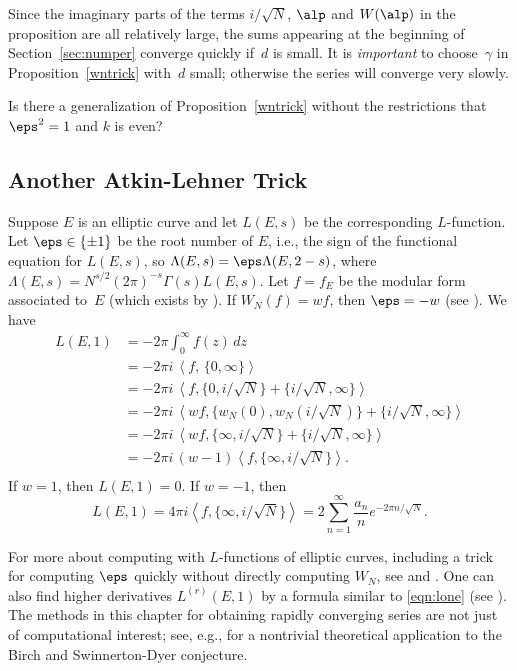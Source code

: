 Since the imaginary parts of the terms $i/\sqrt{N}$, $\alp$ and
$W(\alp)$ in the proposition are all relatively large, the sums
appearing at the beginning of Section~\ref{sec:numper} converge
quickly if~$d$ is small.  It is {\em important} to
choose~$\gamma$ in Proposition~\ref{wntrick} with~$d$ small; otherwise
the series will converge very slowly.

\begin{remark}
  Is there a generalization of Proposition~\ref{wntrick}
  without the restrictions that $\eps^2=1$ and $k$ is even?
\end{remark}

\subsection{Another Atkin-Lehner Trick}
  Suppose $E$ is an elliptic curve and let $L(E,s)$ be the
  corresponding $L$-function.  Let $\eps\in\{\pm 1\}$ be the root
  number of $E$, i.e., the sign of the functional equation for
  $L(E,s)$, so $\Lambda(E,s) = \eps\Lambda(E,2-s)$, where
  $\Lambda(E,s) = N^{s/2} (2\pi)^{-s} \Gamma(s) L(E,s)$.
Let $f=f_E$ be the modular form associated to~$E$ (which
exists by \cite{wiles:fermat, breuil-conrad-diamond-taylor}).
  If $W_N(f) = w f$, then $\eps = -w$ (see ).
  We have
\begin{align*}
   L(E,1) &= -2\pi \int_{0}^{\infty} f(z)\, dz \\
          &= -2\pi i \, \left\langle f,\, \{0,\infty\}\right\rangle\\
    &=-2\pi i\, \left\langle f, \{0,i/\sqrt{N}\} + \{i/\sqrt{N}, \infty\}\right\rangle\\
    &=-2\pi i\, \left\langle wf, \{w_N(0), w_N(i/\sqrt{N})\} 
                    + \{i/\sqrt{N}, \infty\}\right\rangle\\
    &=-2\pi i\, \left\langle wf, \{\infty , i/\sqrt{N}\} 
                    + \{i/\sqrt{N}, \infty\}\right\rangle\\
    &=-2\pi i\, (w-1) \left\langle f, \{\infty , i/\sqrt{N}\} \right\rangle.\\
\end{align*}
If $w=1$, then $L(E,1)=0$.  If $w= -1$, then 
\begin{equation}\label{eqn:lone}
 L(E,1) = 4\pi i \left\langle f, \{\infty , i/\sqrt{N}\} \right\rangle
    =  2 \sum_{n=1}^{\infty} \frac{a_n}{n} e^{-2\pi n/\sqrt{N}}.
  \end{equation}
  
  For more about computing with $L$-functions of elliptic curves,
  including a trick for computing $\eps$ quickly without directly
  computing $W_N$, see \cite[\S7.5]{cohen:course_ant} and
  \cite[\S2.11]{cremona:algs}.  One can also find higher derivatives
  $L^{(r)}(E,1)$ by a formula similar to \eqref{eqn:lone} (see
  \cite[\S2.13]{cremona:algs}).  The methods in this chapter for
  obtaining rapidly converging series are not just of computational
  interest; see, e.g., \cite{greenberg:bsd} for a nontrivial
  theoretical application to the Birch and Swinnerton-Dyer conjecture.


